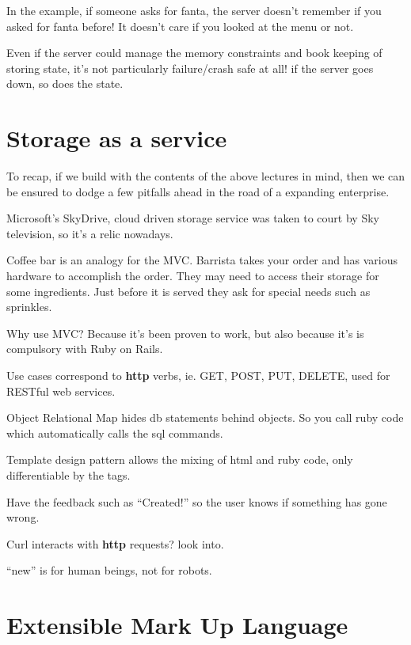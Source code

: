 \documentclass[11pt]{article}
\begin{document}
In the example, if someone asks for fanta, the server doesn’t remember if you asked for fanta before! It doesn’t care if you looked at the menu or not.

Even if the server could manage the memory constraints and book keeping of storing state, it’s not particularly failure/crash safe at all! if the server goes down, so does the state.


\section{Storage as a service}

To recap, if we build with the contents of the above lectures in mind, then we can be ensured to dodge a few pitfalls ahead in the road of a expanding enterprise.

Microsoft’s SkyDrive, cloud driven storage service was taken to court by Sky television, so it’s a relic nowadays.

Coffee bar is an analogy for the MVC. Barrista takes your order and has various hardware to accomplish the order. They may need to access their storage for some ingredients. Just before it is served they ask for special needs such as sprinkles.

Why use MVC? Because it’s been proven to work, but also because it’s is compulsory with Ruby on Rails.

Use cases correspond to \textbf{http} verbs, ie. GET, POST, PUT, DELETE, used for RESTful web services.

Object Relational Map hides db statements behind objects. So you call ruby code which automatically calls the sql commands.

Template design pattern allows the mixing of html and ruby code, only differentiable by the tags.

Have the feedback such as “Created!” so the user knows if something has gone wrong.

Curl interacts with \textbf{http} requests? look into.

“new” is for human beings, not for robots.


\section{Extensible Mark Up Language}
\label{sec:XML}
\end{document}
